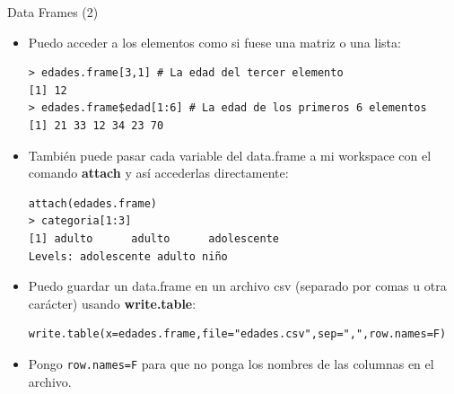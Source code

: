 \documentclass[handout]{beamer}
\begin{document}
\begin{frame}[fragile]{Data Frames (2)}
\scriptsize{ 
\begin{itemize}
 \item Puedo acceder a los elementos como si fuese una matriz o una lista:
 \begin{verbatim}
> edades.frame[3,1] # La edad del tercer elemento
[1] 12
> edades.frame$edad[1:6] # La edad de los primeros 6 elementos
[1] 21 33 12 34 23 70
 \end{verbatim}
 
\item También puede pasar cada variable del data.frame a mi workspace con el comando \textbf{attach} y así accederlas directamente:
\begin{verbatim}
attach(edades.frame)
> categoria[1:3]
[1] adulto      adulto      adolescente
Levels: adolescente adulto niño
\end{verbatim}

\item Puedo guardar un data.frame en un archivo csv (separado por comas u otra carácter) usando \textbf{write.table}:
\begin{verbatim}
write.table(x=edades.frame,file="edades.csv",sep=",",row.names=F) 
\end{verbatim}

\item Pongo \verb+row.names=F+ para que no ponga los nombres de las columnas en el archivo.

 
\end{itemize}
 
}
\end{frame}
\end{document}
